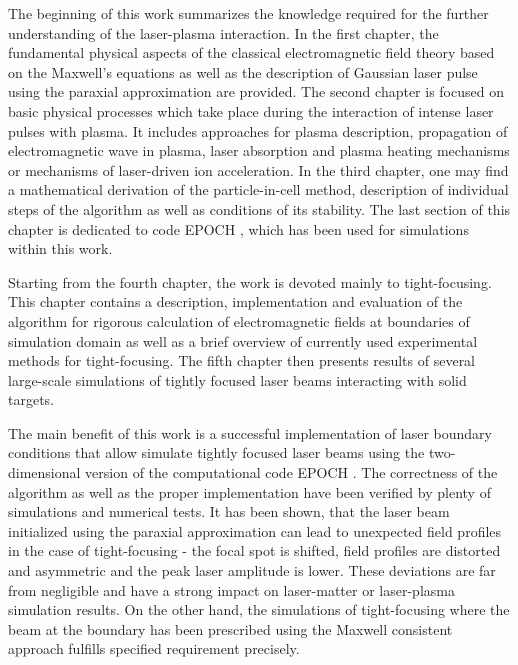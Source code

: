The beginning of this work summarizes the knowledge required for the further understanding of the laser-plasma interaction. In the first chapter, the fundamental physical aspects of the classical electromagnetic field theory \cite{Stratton2007, Jackson2005, Feynman1963, Thide2011} based on the Maxwell's equations as well as the description of Gaussian laser pulse using the paraxial approximation \cite{Born2013} are provided. The second chapter is focused on basic physical processes which take place during the interaction of intense laser pulses with plasma. It includes approaches for plasma description, propagation of electromagnetic wave in plasma, laser absorption and plasma heating mechanisms or mechanisms of laser-driven ion acceleration. In the third chapter, one may find a mathematical derivation of the particle-in-cell method, description of individual steps of the algorithm as well as conditions of its stability. The last section of this chapter is dedicated to code EPOCH \cite{bennett}, which has been used for simulations within this work. 

Starting from the fourth chapter, the work is devoted mainly to tight-focusing. This chapter contains a description, implementation and evaluation of the algorithm for rigorous calculation of electromagnetic fields at boundaries of simulation domain \cite{Thiele2016} as well as a brief overview of currently used experimental methods for tight-focusing. The fifth chapter then presents results of several large-scale simulations of tightly focused laser beams interacting with solid targets.

The main benefit of this work is a successful implementation of laser boundary conditions that allow simulate tightly focused laser beams using the two-dimensional version of the computational code EPOCH \cite{bennett}. The correctness of the algorithm as well as the proper implementation have been verified by plenty of simulations and numerical tests. It has been shown, that the laser beam initialized using the paraxial approximation can lead to unexpected field profiles in the case of tight-focusing - the focal spot is shifted, field profiles are distorted and asymmetric and the peak laser amplitude is lower. These deviations are far from negligible and have a strong impact on laser-matter or laser-plasma simulation results. On the other hand, the simulations of tight-focusing where the beam at the boundary has been prescribed using the Maxwell consistent approach \cite{Thiele2016} fulfills specified requirement precisely.

